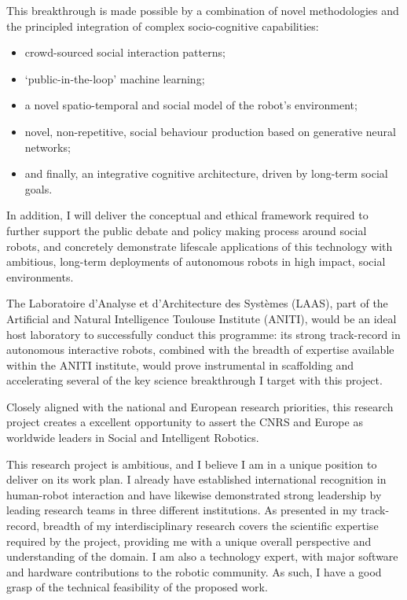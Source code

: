 This breakthrough is made possible by a combination of novel methodologies and
the principled integration of complex socio-cognitive capabilities:

\begin{itemize}
        \item crowd-sourced social interaction patterns;
        \item `public-in-the-loop' machine learning;
        \item a novel spatio-temporal and social model of the robot's environment;
        \item novel, non-repetitive, social behaviour production based on
            generative neural networks;
        \item and finally, an integrative cognitive architecture, driven by
            long-term social goals.
\end{itemize}


In addition, I will deliver the conceptual and ethical framework
required to further support the public debate and policy making process
around social robots, and concretely demonstrate lifescale applications of
this technology with ambitious, long-term deployments of autonomous robots
in high impact, social environments.

The Laboratoire d'Analyse et d'Architecture des Systèmes (LAAS), part
of the Artificial and Natural Intelligence Toulouse Institute (ANITI), would
be an ideal host laboratory to successfully conduct this programme: its
strong track-record in autonomous interactive robots, combined with the breadth
of expertise available within the ANITI institute, would prove instrumental in
scaffolding and accelerating several of the key science breakthrough I target
with this project.

Closely aligned with the national and European research priorities,
this research project creates a excellent opportunity to assert the CNRS and
Europe as worldwide leaders in Social and Intelligent Robotics.


This research project is ambitious, and I believe I am in a unique position to
deliver on its work plan. I already have established international recognition in
human-robot interaction and have likewise demonstrated strong leadership by
leading research teams in three different institutions. As presented in my
track-record, breadth of my interdisciplinary research covers the scientific expertise
required by the project, providing me with a unique overall perspective and
understanding of the domain. I am also a technology expert, with major software
and hardware contributions to the robotic community. As such,
I have a good grasp of the technical feasibility of the proposed work.


